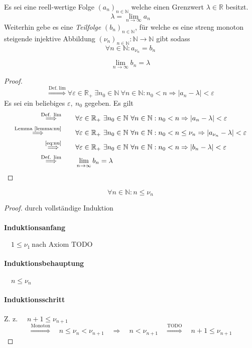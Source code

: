 \documentclass[a4paper, 12pt]{scrartcl}
\newcommand{\defimpl}[1]{\stackrel{\text{Def.}\;#1}{\Longrightarrow}}
\newcommand{\txtimpl}[1]{\stackrel{\text{#1}}{\Longrightarrow}}
\newcommand{\refimpl}[1]{\txtimpl{\eqref{#1}}}
\begin{document}
Es sei eine reell-wertige Folge $(a_n)_{n \in \mathbb{N}}$ welche einen Grenzwert $\lambda \in \mathbb{R}$ besitzt.
\[ \lambda = \lim_{n \rightarrow \infty} a_n \]
Weiterhin gebe es eine \emph{Teilfolge} $(b_n)_{n \in \mathbb{N}}$, für welche es eine streng monoton steigende injektive Abbildung $(\nu_n)_{n \in \mathbb{N}} : \mathbb{N} \rightarrow \mathbb{N}$ gibt sodass
\begin{equation}\label{eq:nu}
	\forall n \in \mathbb{N}: a_{\nu_n} = b_n
\end{equation}
\begin{theorem}
	\[ \lim_{n \rightarrow \infty} b_n = \lambda \]
\end{theorem}
\begin{proof}
\[ \defimpl{\lim} \forall \varepsilon \in \mathbb{R}_+\ \exists n_0 \in \mathbb{N}\ \forall n \in \mathbb{N} : n_0 < n \Rightarrow |a_n-\lambda| < \varepsilon \]
Es sei ein beliebiges $\varepsilon,\ n_0$ gegeben. Es gilt
\begin{align*}
	\defimpl{\lim}\qquad &\forall \varepsilon \in \mathbb{R}_+\ \exists n_0 \in \mathbb{N}\ \forall n \in \mathbb{N} : n_0 < n \Rightarrow |a_n-\lambda| < \varepsilon \\
	\txtimpl{Lemma \ref{lemma:nu}}\qquad  &\forall \varepsilon \in \mathbb{R}_+\ \exists n_0 \in \mathbb{N}\ \forall n \in \mathbb{N} : n_0 < n \leq \nu_n \Rightarrow |a_{\nu_n}-\lambda| < \varepsilon \\
	\refimpl{eq:nu} \qquad  &\forall \varepsilon \in \mathbb{R}_+\ \exists n_0 \in \mathbb{N}\ \forall n \in \mathbb{N} : n_0 < n \Rightarrow |b_n-\lambda| < \varepsilon \\
	\defimpl{\lim} \qquad & \lim_{n \rightarrow \infty} b_n = \lambda
\end{align*}
\end{proof}
\begin{lemma}\label{lemma:nu}
	\[ \forall n \in \mathbb{N}: n \leq \nu_n \]
\end{lemma}
\begin{proof}
durch vollständige Induktion

\paragraph*{Induktionsanfang} $\quad 1 \leq \nu_1\ \text{nach Axiom TODO}$
\paragraph*{Induktionsbehauptung} $\quad n \leq \nu_n$
\paragraph*{Induktionsschritt} Z. z. $\quad n+1 \leq \nu_{n+1}$
\[ 	\txtimpl{Monoton}\quad  n \leq \nu_n < \nu_{n+1} \quad\Rightarrow \quad n < \nu_{n+1} \quad\txtimpl{TODO} \quad n+1 \leq \nu_{n+1} \]
\end{proof}
\end{document}
